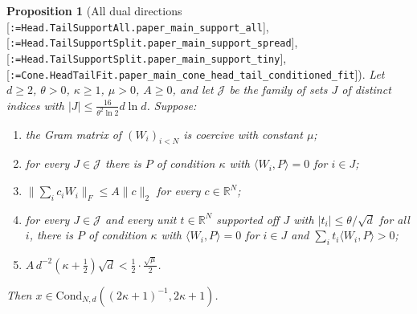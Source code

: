 \documentclass[11pt]{article}
\makeatletter
\newcommand{\formal@break}[1]{\@tfor\formal@tok:=#1\do{%
  \formal@tok
  \expandafter\ifx\formal@tok.\allowbreak\else
  \expandafter\ifx\formal@tok\_\allowbreak\fi\fi}}
\DeclareRobustCommand{\formal}[1]{\textnormal{[\texttt{\small\formal@break{#1}}]}}
\newcommand{\R}{\mathbb{R}}
\newcommand{\ip}[2]{\langle #1, #2\rangle}
\newcommand{\norm}[1]{\lVert #1\rVert}
\newcommand{\abs}[1]{\lvert #1\rvert}
\newcommand{\Fro}{F}
\newcommand{\sqd}{\sqrt{d}}
\newcommand{\Cond}{\mathrm{Cond}}
\theoremstyle{plain}
\newtheorem{proposition}[theorem]{Proposition}
\theoremstyle{definition}
\makeatother
\begin{document}
\begin{proposition}[All dual directions \formal{Head.TailSupportAll.paper\_main\_support\_all}, \formal{Head.TailSupportSplit.paper\_main\_support\_spread}, \formal{Head.TailSupportSplit.paper\_main\_support\_tiny}, \formal{Cone.HeadTailFit.paper\_main\_cone\_head\_tail\_conditioned\_fit}]\label{prop:support_all}
Let $d \ge 2$, $\theta > 0$, $\kappa \ge 1$, $\mu > 0$, $A \ge 0$, and let
$\mathcal{J}$ be the family of sets $J$ of distinct indices with
$\abs{J} \le \frac{16}{\theta^2\ln2}d\ln d$. Suppose:
\begin{enumerate}
\item[(i)] the Gram matrix of $(W_i)_{i<N}$ is coercive with constant $\mu$;
\item[(ii)] for every $J \in \mathcal{J}$ there is $P$ of condition $\kappa$ with $\ip{W_i}{P} = 0$ for $i \in J$;
\item[(iii)] $\norm{\sum_ic_iW_i}_\Fro \le A\norm{c}_2$ for every $c \in \R^N$;
\item[(iv)] for every $J \in \mathcal{J}$ and every unit $t \in \R^N$ supported off $J$ with
$\abs{t_i} \le \theta/\sqd$ for all $i$, there is $P$ of condition $\kappa$ with
$\ip{W_i}{P} = 0$ for $i \in J$ and $\sum_it_i\ip{W_i}{P} > 0$;
\item[(v)] $A\,d^{-2}(\kappa + \tfrac12)\sqd < \tfrac12\cdot\tfrac{\sqrt\mu}{2}$.
\end{enumerate}
Then $x \in \Cond_{N,d}((2\kappa+1)^{-1}, 2\kappa+1)$.
\end{proposition}
\end{document}
